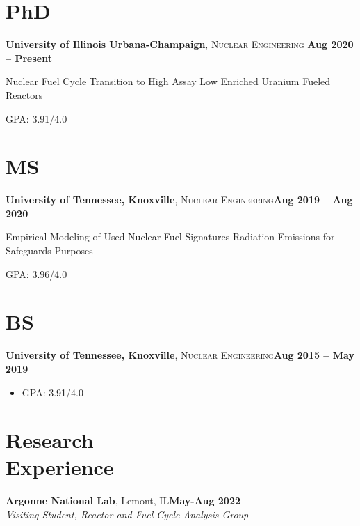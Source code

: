 \documentclass[margin,line]{resume}
\begin{document}
\begin{resume}
    \section{\mysidestyle PhD}
    \textbf{University of Illinois Urbana-Champaign}, \textsc{Nuclear Engineering}\hfill \textbf{ Aug 2020 -- Present}\vspace{-3mm}\\\vspace{-1mm}%
    \begin{list2}
        \item Nuclear Fuel Cycle Transition to High Assay Low Enriched Uranium Fueled Reactors
        \item GPA: 3.91/4.0
    \end{list2}\vspace{-4mm}
    \section{\mysidestyle MS}
    \textbf{University of Tennessee, Knoxville}, \textsc{Nuclear Engineering}\hfill\textbf{Aug 2019 -- Aug 2020}\vspace{-3mm}\\\vspace{-1mm}%
    \begin{list2}
        \item Empirical Modeling of Used Nuclear Fuel Signatures Radiation Emissions for Safeguards Purposes
        \item GPA: 3.96/4.0
    \end{list2}\vspace{-4mm}
    \section{\mysidestyle BS}
    \textbf{University of Tennessee, Knoxville}, \textsc{Nuclear Engineering}\hfill\textbf{Aug 2015 -- May 2019}\vspace{-3mm}\\\vspace{-1mm}%
    \begin{itemize}
        \item GPA: 3.91/4.0
    \end{itemize}\vspace{-2mm}
    
    \section{\mysidestyle Research\\Experience}
    \textbf{Argonne National Lab}, Lemont, IL\hfill\textbf{May-Aug 2022}\\
    \vspace{-5mm}
                \textsl{Visiting Student, Reactor and Fuel Cycle Analysis Group}\\
        

\end{resume}
\end{document}
